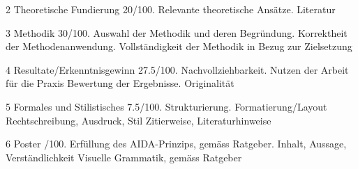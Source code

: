 \documentclass{ffhsthesis}
\begin{document}
2 Theoretische Fundierung 20/100. Relevante theoretische Ansätze. Literatur\newline

3 Methodik 30/100. Auswahl der Methodik und deren Begründung. Korrektheit der Methodenanwendung. Vollständigkeit der Methodik in Bezug zur Zielsetzung\newline

4 Resultate/Erkenntnisgewinn 27.5/100. Nachvollziehbarkeit. Nutzen der Arbeit für die Praxis Bewertung der Ergebnisse. Originalität\newline

5 Formales und Stilistisches 7.5/100. Strukturierung. Formatierung/Layout Rechtschreibung, Ausdruck, Stil Zitierweise, Literaturhinweise\newline

6 Poster /100. Erfüllung des AIDA-Prinzips, gemäss Ratgeber. Inhalt, Aussage, Verständlichkeit Visuelle Grammatik, gemäss Ratgeber\newline
\fi
\end{document}
